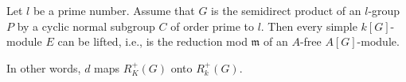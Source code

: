 Let $l$ be a prime number. Assume that $G$ is the semidirect product of an $l$-group $P$ by a cyclic normal subgroup $C$ of order prime to $l$. Then every simple $k[G]$-module $E$ can be lifted, i.e., is the reduction mod $\mathfrak{m}$ of an $A$-free $A[G]$-module.

In other words, $d$ maps $R_K^+(G)$ onto $R_k^+(G)$.
